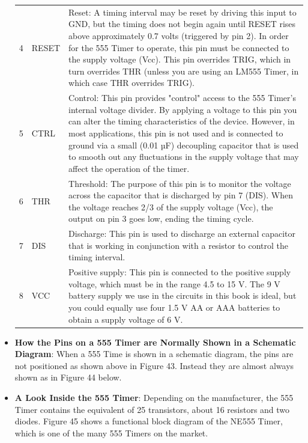 \documentclass{report}
\begin{document}
\begin{itemize}
\begin{center}
\begin{tabularx}{\textwidth}{@{}llX@{}}
                    4& RESET& Reset: A timing interval may be reset by driving this input to GND, but the timing does not begin again until RESET rises above approximately 0.7 volts (triggered by pin 2). In order for the 555 Timer to operate, this pin must be connected to the supply voltage (Vcc). This pin overrides TRIG, which in turn overrides THR (unless you are using an LM555 Timer, in which case THR overrides TRIG).\\[2ex]
                    5& CTRL& Control: This pin provides "control" access to the 555 Timer's internal voltage divider. By applying a voltage to this pin you can alter the timing characteristics of the device. However, in most applications, this pin is not used and is connected to ground via a small (0.01 µF) decoupling capacitor that is used to smooth out any fluctuations in the supply voltage that may affect the operation of the timer.\\[2ex]
                    6& THR& Threshold: The purpose of this pin is to monitor the voltage across the capacitor that is discharged by pin 7 (DIS). When the voltage reaches 2/3 of the supply voltage (Vcc), the output on pin 3 goes low, ending the timing cycle.\\[2ex]
                    7& DIS& Discharge: This pin is used to discharge an external capacitor that is working in conjunction with a resistor to control the timing interval.\\[2ex]
                    8& VCC& Positive supply: This pin is connected to the positive supply voltage, which must be in the range 4.5 to 15 V. The 9 V battery supply we use in the circuits in this book is ideal, but you could equally use four 1.5 V AA or AAA batteries to obtain a supply voltage of 6 V. \\
                    \bottomrule
                \end{tabularx}
            \end{center}
        \item \textbf{How the Pins on a 555 Timer are Normally Shown in a Schematic Diagram}: When a 555 Time is shown in a schematic diagram, the pins are not positioned as shown above in Figure 43. Instead they are almost always shown as in Figure 44 below.
            \bigbreak \noindent 
        \item \textbf{A Look Inside the 555 Timer}: Depending on the manufacturer, the 555 Timer contains the equivalent of 25 transistors, about 16 resistors and two diodes. Figure 45 shows a functional block diagram of the NE555 Timer, which is one of the many 555 Timers on the market.

\end{itemize}
\end{document}
